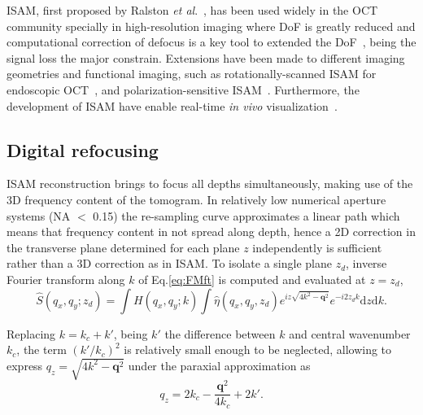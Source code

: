 ISAM, first proposed by Ralston \textit{et al}.~\cite{Ralston2006_Interferometric}, has been used widely in the OCT community specially in high-resolution imaging where DoF is greatly reduced and computational correction of defocus is a key tool to extended the DoF~\cite{Liu2014_Computed, Boppart2015_Computational, Yi2019_Structure, Zysk2015_Intraoperative}, being the signal loss the major constrain. Extensions have been made to different imaging geometries and functional imaging, such as rotationally-scanned ISAM for endoscopic OCT~\cite{Marks2006_Inverse-1, Marks2006_Inverse}, and polarization-sensitive ISAM~\cite{Davis2007_Polarimetric}. Furthermore, the development of ISAM have enable real-time \textit{in vivo} visualization~\cite{Ralston2008_Realtime, Ralston2013_Interferometric, St.Marie2013_Robust}. 

\subsection{Digital refocusing}

ISAM reconstruction brings to focus all depths simultaneously, making use of the 3D frequency content of the tomogram. In relatively low numerical aperture systems (NA $<$ 0.15) the re-sampling curve approximates a linear path which means that frequency content in not spread along depth, hence a 2D correction in the transverse plane determined for each plane $z$ independently is sufficient~\cite{Yasuno2006_Noniterative, South2016_Computed} rather than a 3D correction as in ISAM. To isolate a single plane $z_d$, inverse Fourier transform along $k$ of Eq.\eqref{eq:FMft} is computed and evaluated at $z=z_d$,
\begin{equation}\label{eq:preDefocus}
    \hat{S}(q_x,q_y; z_d) = \int H(q_x, q_y; k) \int \hat{\eta}(q_x,q_y, z_d) e^{iz\sqrt{4k^2-\mathbf{q}^2}} e^{-i2z_dk} \text{d}z\text{d}k.
\end{equation}

Replacing $k=k_c + k'$, being $k'$ the difference between $k$ and central wavenumber $k_c$, the term $(k'/k_c)^2$ is relatively small enough to be neglected, allowing to express $q_z=\sqrt{4k^2-\mathbf{q}^2}$ under the paraxial approximation as~\cite{South2016_Computed}
\begin{equation}\label{eq:qzAprox}
    q_z = 2k_c - \frac{\mathbf{q}^2}{4k_c} + 2k'.
\end{equation}

